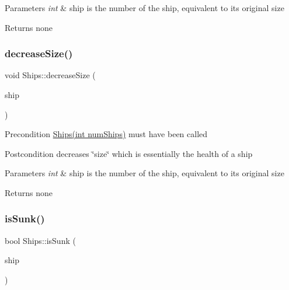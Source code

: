 \begin{DoxyParams}{Parameters}
{\em int} & ship is the number of the ship, equivalent to its original size \\
\hline
\end{DoxyParams}
\begin{DoxyReturn}{Returns}
none 
\end{DoxyReturn}
\mbox{\label{classShips_ad77281b5c68f9fcc7583c6766f2aac3f}} 
\subsubsection{\texorpdfstring{decrease\+Size()}{decreaseSize()}}
{\footnotesize\ttfamily void Ships\+::decrease\+Size (\begin{DoxyParamCaption}\item[{int}]{ship }\end{DoxyParamCaption})}

\begin{DoxyPrecond}{Precondition}
\hyperlink{classShips_aabbca77f901e307950267b22383be013}{Ships(int num\+Ships)} must have been called 
\end{DoxyPrecond}
\begin{DoxyPostcond}{Postcondition}
decreases \char`\"{}size\char`\"{} which is essentially the health of a ship 
\end{DoxyPostcond}

\begin{DoxyParams}{Parameters}
{\em int} & ship is the number of the ship, equivalent to its original size \\
\hline
\end{DoxyParams}
\begin{DoxyReturn}{Returns}
none 
\end{DoxyReturn}
\mbox{\label{classShips_a06a243e4251ffef7461eefff4d69e512}} 
\subsubsection{\texorpdfstring{is\+Sunk()}{isSunk()}}
{\footnotesize\ttfamily bool Ships\+::is\+Sunk (\begin{DoxyParamCaption}\item[{int}]{ship }\end{DoxyParamCaption})}

